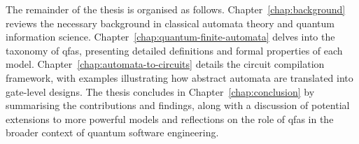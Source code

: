 The remainder of the thesis is organised as follows. Chapter~\ref{chap:background} reviews the necessary background in classical automata theory and quantum information science. Chapter~\ref{chap:quantum-finite-automata} delves into the taxonomy of \glspl{qfa}, presenting detailed definitions and formal properties of each model. Chapter~\ref{chap:automata-to-circuits} details the circuit compilation framework, with examples illustrating how abstract automata are translated into gate-level designs. The thesis concludes in Chapter~\ref{chap:conclusion} by summarising the contributions and findings, along with a discussion of potential extensions to more powerful models and reflections on the role of \glspl{qfa} in the broader context of quantum software engineering.


